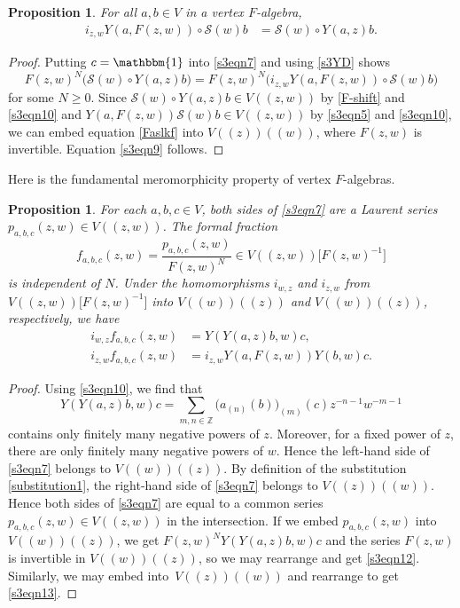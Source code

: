 \documentclass[10pt,a4paper]{amsart}
\numberwithin{equation}{section}
\newtheorem{Proposition}[Theorem]{Proposition}
\theoremstyle{definition}
\begin{document}
\begin{Proposition}
For all $a,b \in V$ in a vertex $F$-algebra,
\begin{align}
\label{s3eqn9}
 i_{z,w}Y(a,F(z,w))\circ\mathcal{S}(w)b&=\mathcal{S}(w)\circ Y(a,z)b.
\end{align}
\end{Proposition}

\begin{proof}
 Putting $c=\mathbbm{1}$ into \eqref{s3eqn7} and using \eqref{s3YD} shows
 \begin{equation}
 \label{Faslkf}
 F(z,w)^N \bigl(\mathcal{S}(w)\circ Y(a,z)b \bigr) = F(z,w)^N\bigl(i_{z,w}Y(a,F(z,w))\circ\mathcal{S}(w)b\bigr)
 \end{equation}
 for some $N\geqslant0$. Since $\mathcal{S}(w)\circ Y(a,z)b \in V(\!( z,w)\!)$ by \eqref{F-shift} and \eqref{s3eqn10} and $Y(a,F(z,w))\mathcal{S}(w)b \in V(\!( z,w)\!)$ by \eqref{s3eqn5} and \eqref{s3eqn10}, we can embed equation \eqref{Faslkf} into $V(\!( z)\!)(\!( w)\!)$, where $F(z,w)$ is invertible. Equation \eqref{s3eqn9} follows.
\end{proof}

Here is the fundamental meromorphicity property of vertex $F$-algebras.

\begin{Proposition}
\label{prop:pabc}
For each $a,b,c\in V$, both sides of \eqref{s3eqn7} are a Laurent series $p_{a,b,c}(z,w)\in V(\!( z,w)\!)$. The formal fraction
\begin{equation}
\label{fABC}
 f_{a,b,c}(z,w)=\frac{p_{a,b,c}(z,w)}{F(z,w)^N}\in V(\!( z,w)\!)\big[F(z,w)^{-1}\big]
\end{equation}
is independent of $N$. Under the homomorphisms $i_{w,z}$ and $i_{z,w}$ from $V(\!( z,w)\!)\big[F(z,w)^{-1}\big]$ into $V(\!( w)\!)(\!( z)\!)$ and $V(\!( w)\!)(\!( z)\!)$, respectively, we have
\begin{align}
 i_{w,z} f_{a,b,c}(z,w)&=Y(Y(a,z)b,w)c,\label{s3eqn12}\\
 i_{z,w} f_{a,b,c}(z,w)&=i_{z,w}Y(a,F(z,w))Y(b,w)c.\label{s3eqn13}
\end{align}
\end{Proposition}

\begin{proof}
Using \eqref{s3eqn10}, we find that
\[
 Y(Y(a,z)b,w)c = \sum_{m,n\in\mathbb{Z}} \bigl(a_{(n)}(b)\bigr)_{(m)}(c) z^{-n-1}w^{-m-1}
\]
contains only finitely many negative powers of $z$. Moreover, for a fixed power of $z$, there are only finitely many negative powers of $w$. Hence the left-hand side of \eqref{s3eqn7} belongs to $V(\!( w)\!)(\!( z)\!)$. By definition of the substitution \eqref{substitution1}, the right-hand side of \eqref{s3eqn7} belongs to $V(\!( z)\!)(\!( w)\!)$. Hence both sides of \eqref{s3eqn7} are equal to a common series $p_{a,b,c}(z,w)\in V(\!( z,w)\!)$ in the intersection. If we embed $p_{a,b,c}(z,w)$ into $V(\!( w)\!)(\!( z)\!)$, we get $F(z,w)^N Y(Y(a,z)b,w)c$ and the series $F(z,w)$ is invertible in $V(\!( w)\!)(\!( z)\!)$, so we may rearrange and get \eqref{s3eqn12}. Similarly, we may embed into~${V(\!( z)\!)(\!( w)\!)}$ and rearrange to get \eqref{s3eqn13}.
\end{proof}
\end{document}

